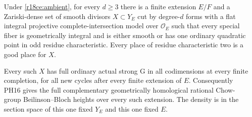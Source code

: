 \begin{theorem}
\label{r18ce:ordinary-family}
Under \eqref{r18ce:ambient}, for every $d\ge3$ there is a
finite extension $E/F$ and a Zariski-dense set of smooth
divisors $X\subset Y_E$ cut by degree-$d$ forms with a
flat integral projective complete-intersection model over
$\mathcal O_E$ such that every special fiber is
geometrically integral and is either smooth or has one
ordinary quadratic point in odd residue characteristic.
Every place of residue characteristic two is a good
place for $X$.

Every such $X$ has full ordinary actual strong G in
all codimensions at every finite completion, for all
new cycles after every finite extension of $E$.
Consequently PH16 gives the full complementary
geometrically homological rational Chow-group
Beilinson--Bloch heights over every such extension.
The density is in the section space of this one fixed
$Y_E$ and this one fixed $E$.
\end{theorem}

